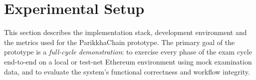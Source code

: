 \documentclass[conference]{IEEEtran}
\begin{document}


\section{Experimental Setup}
\label{sec:setup}

This section describes the implementation stack, development environment and the metrics used for the ParikkhaChain prototype. The primary
goal of the prototype is a \emph{full-cycle demonstration}: to exercise every
phase of the exam cycle end-to-end on a local or test-net
Ethereum environment using mock examination data, and to evaluate the system's
functional correctness and workflow integrity.
\end{document}
